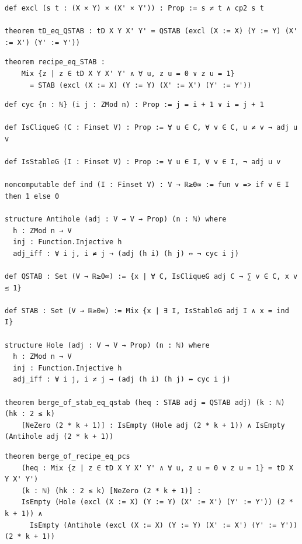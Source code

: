 \label{lean:td-eq-qstab}
\begin{lstlisting}
def excl (s t : (X × Y) × (X' × Y')) : Prop := s ≠ t ∧ cp2 s t

theorem tD_eq_QSTAB : tD X Y X' Y' = QSTAB (excl (X := X) (Y := Y) (X' := X') (Y' := Y'))
\end{lstlisting}

\label{lean:recipe-eq-stab}
\begin{lstlisting}
theorem recipe_eq_STAB :
    Mix {z | z ∈ tD X Y X' Y' ∧ ∀ u, z u = 0 ∨ z u = 1}
      = STAB (excl (X := X) (Y := Y) (X' := X') (Y' := Y'))
\end{lstlisting}

\label{lean:berge-of-stab-eq-qstab}
\begin{lstlisting}
def cyc {n : ℕ} (i j : ZMod n) : Prop := j = i + 1 ∨ i = j + 1

def IsCliqueG (C : Finset V) : Prop := ∀ u ∈ C, ∀ v ∈ C, u ≠ v → adj u v

def IsStableG (I : Finset V) : Prop := ∀ u ∈ I, ∀ v ∈ I, ¬ adj u v

noncomputable def ind (I : Finset V) : V → ℝ≥0∞ := fun v => if v ∈ I then 1 else 0

structure Antihole (adj : V → V → Prop) (n : ℕ) where
  h : ZMod n → V
  inj : Function.Injective h
  adj_iff : ∀ i j, i ≠ j → (adj (h i) (h j) ↔ ¬ cyc i j)

def QSTAB : Set (V → ℝ≥0∞) := {x | ∀ C, IsCliqueG adj C → ∑ v ∈ C, x v ≤ 1}

def STAB : Set (V → ℝ≥0∞) := Mix {x | ∃ I, IsStableG adj I ∧ x = ind I}

structure Hole (adj : V → V → Prop) (n : ℕ) where
  h : ZMod n → V
  inj : Function.Injective h
  adj_iff : ∀ i j, i ≠ j → (adj (h i) (h j) ↔ cyc i j)

theorem berge_of_stab_eq_qstab (heq : STAB adj = QSTAB adj) (k : ℕ) (hk : 2 ≤ k)
    [NeZero (2 * k + 1)] : IsEmpty (Hole adj (2 * k + 1)) ∧ IsEmpty (Antihole adj (2 * k + 1))
\end{lstlisting}

\label{lean:berge-of-recipe-eq-pcs}
\begin{lstlisting}
theorem berge_of_recipe_eq_pcs
    (heq : Mix {z | z ∈ tD X Y X' Y' ∧ ∀ u, z u = 0 ∨ z u = 1} = tD X Y X' Y')
    (k : ℕ) (hk : 2 ≤ k) [NeZero (2 * k + 1)] :
    IsEmpty (Hole (excl (X := X) (Y := Y) (X' := X') (Y' := Y')) (2 * k + 1)) ∧
      IsEmpty (Antihole (excl (X := X) (Y := Y) (X' := X') (Y' := Y')) (2 * k + 1))
\end{lstlisting}

